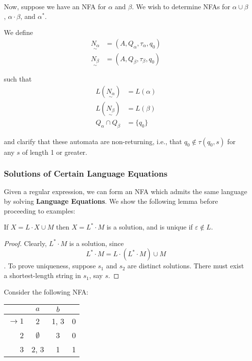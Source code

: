 Now, suppose we have an NFA for $\alpha$ and $\beta$. We wish to determine NFAs for $\alpha\cup\beta$, $\alpha\cdot\beta$, and $\alpha^*$. 

We define \begin{align*}
      \underset{\sim}{N_\alpha} &= (A, Q_{\alpha}, \tau_{\alpha}, q_0)\\
      \underset{\sim}{N_\beta}  &= (A, Q_{\beta}, \tau_{\beta}, q_0)
\end{align*}

such that \begin{align*}
      L(\underset{\sim}{N_\alpha}) &= L(\alpha)\\
      L(\underset{\sim}{N_\beta})  &= L(\beta)\\
      Q_\alpha\cap Q_\beta&=\{q_0\}
\end{align*}

and clarify that these automata are non-returning, i.e., that $q_0\not\in\tau(q_0, s)$ for any $s$ of length 1 or greater.

\subsubsection{Solutions of Certain Language Equations}

Given a regular expression, we can form an NFA which admits the same language by solving \textbf{Language Equations}. We show the following lemma before proceeding to examples:

\begin{lemma}
      If $X=L\cdot X\cup M$ then $X=L^*\cdot M$ is a solution, and is unique if $\varepsilon\not\in L$. 
\end{lemma}

\begin{proof}
      Clearly, $L^*\cdot M$ is a solution, since \[L^*\cdot M = L\cdot (L^*\cdot M)\cup M\]. To prove uniqueness, suppose $s_1$ and $s_2$ are distinct solutions. There must exist a shortest-length string in $s_1$, say $s$. 
\end{proof}

Consider the following NFA:

\begin{center}\begin{tabular}{r| c c r}
      & $a$ & $b$ & \\\hline
      $\to 1$ & 2 & 1, 3 & 0\\
            2 & $\emptyset$ & 3 & 0\\
            3 & 2, 3 & 1 & 1
 \end{tabular}\end{center}

